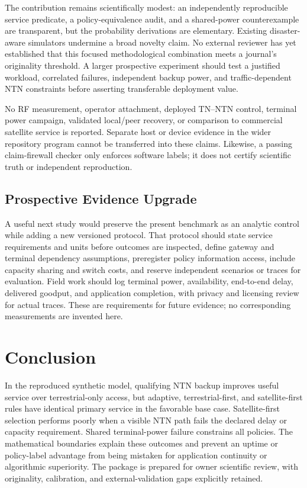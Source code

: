\documentclass[10pt,twocolumn]{article}
\begin{document}
The contribution remains scientifically modest: an independently reproducible service predicate, a policy-equivalence audit, and a shared-power counterexample are transparent, but the probability derivations are elementary. Existing disaster-aware simulators undermine a broad novelty claim. No external reviewer has yet established that this focused methodological combination meets a journal's originality threshold. A larger prospective experiment should test a justified workload, correlated failures, independent backup power, and traffic-dependent NTN constraints before asserting transferable deployment value.

No RF measurement, operator attachment, deployed TN--NTN control, terminal power campaign, validated local/peer recovery, or comparison to commercial satellite service is reported. Separate host or device evidence in the wider repository program cannot be transferred into these claims. Likewise, a passing claim-firewall checker only enforces software labels; it does not certify scientific truth or independent reproduction.

\subsection{Prospective Evidence Upgrade}
A useful next study would preserve the present benchmark as an analytic control while adding a new versioned protocol. That protocol should state service requirements and units before outcomes are inspected, define gateway and terminal dependency assumptions, preregister policy information access, include capacity sharing and switch costs, and reserve independent scenarios or traces for evaluation. Field work should log terminal power, availability, end-to-end delay, delivered goodput, and application completion, with privacy and licensing review for actual traces. These are requirements for future evidence; no corresponding measurements are invented here.

\section{Conclusion}
In the reproduced synthetic model, qualifying NTN backup improves useful service over terrestrial-only access, but adaptive, terrestrial-first, and satellite-first rules have identical primary service in the favorable base case. Satellite-first selection performs poorly when a visible NTN path fails the declared delay or capacity requirement. Shared terminal-power failure constrains all policies. The mathematical boundaries explain these outcomes and prevent an uptime or policy-label advantage from being mistaken for application continuity or algorithmic superiority. The package is prepared for owner scientific review, with originality, calibration, and external-validation gaps explicitly retained.
\end{document}
